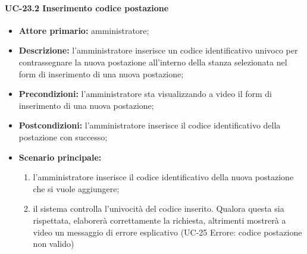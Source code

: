 \paragraph{UC-23.2 Inserimento codice postazione}
\begin{itemize}
	\item \textbf{Attore primario:} amministratore;
	\item \textbf{Descrizione:} l'amministratore inserisce un codice identificativo univoco per contrassegnare la nuova postazione all'interno della stanza selezionata nel form di inserimento di una nuova postazione;
	\item \textbf{Precondizioni:} l'amministratore sta visualizzando a video il form di inserimento di una nuova postazione;
	\item \textbf{Postcondizioni:} l'amministratore inserisce il codice identificativo della postazione con successo;
	\item \textbf{Scenario principale:}
	      \begin{enumerate}
		      \item l'amministratore inserisce il codice identificativo della nuova postazione che si vuole aggiungere;
		      \item il sistema controlla l'univocità del codice inserito. Qualora questa sia rispettata, elaborerà correttamente la richiesta, altrimenti mostrerà a video un messaggio di errore esplicativo (UC-25 Errore: codice postazione non valido)
	      \end{enumerate}
\end{itemize}
    

